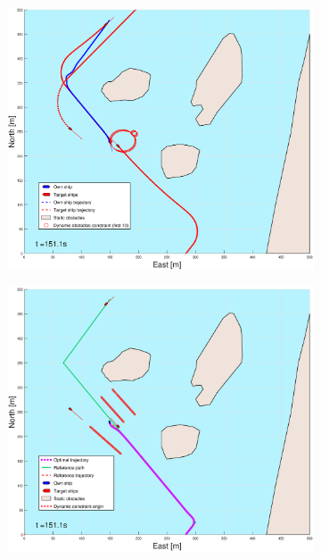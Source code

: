\begin{figure}[ht]
\begin{subfigure}[b]{0.499\textwidth}
    \end{subfigure}
    \hfill
    \\ 
    \begin{subfigure}[b]{0.49\textwidth}
        \centering
        \includegraphics[width=\textwidth]{Images/Figures/Helloya_Rev/_Simple_1fig1_time=151}
    \end{subfigure}
    \hfill
    \begin{subfigure}[b]{0.499\textwidth}
        \centering
        \includegraphics[width=\textwidth]{Images/Figures/Helloya_Rev/_Simple_1fig999_time=151}
    \end{subfigure}
    \hfill
\end{figure}
